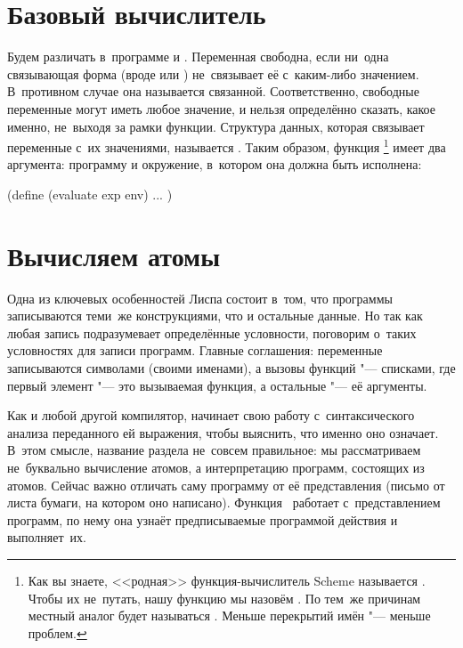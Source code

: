 \section{Базовый вычислитель}\label{basics/sect:basic-evaluator}

Будем различать в~программе  и .
Переменная свободна, если ни~одна связывающая форма (вроде  или
) не~связывает её с~каким-либо значением. В~противном случае она
называется связанной. Соответственно, свободные переменные могут иметь любое
значение, и нельзя определённо сказать, какое именно, не~выходя за рамки
функции. Структура данных, которая связывает переменные с~их значениями,
называется . Таким образом, функция \footnote{Как
вы знаете, <<родная>> функция-вычислитель Scheme называется . Чтобы их
не~путать, нашу функцию мы назовём . По тем~же причинам местный
аналог  будет называться . Меньше перекрытий имён "---
меньше проблем.} имеет два аргумента: программу и окружение, в~котором она
должна быть исполнена:

\begin{code:lisp}
(define (evaluate exp env) ... )
\end{code:lisp}


\section{Вычисляем атомы}\label{basics/sect:evaluating-atoms}

Одна из ключевых особенностей Лиспа состоит в~том, что программы записываются
теми~же конструкциями, что и остальные данные. Но так как любая запись
подразумевает определённые условности, поговорим о~таких условностях для записи
программ. Главные соглашения: переменные записываются символами (своими
именами), а вызовы функций "--- списками, где первый элемент "--- это вызываемая
функция, а остальные "--- её аргументы.

Как и любой другой компилятор,  начинает свою работу
с~синтаксического анализа переданного ей выражения, чтобы выяснить, что именно
оно означает. В~этом смысле, название раздела не~совсем правильное: мы
рассматриваем не~буквально вычисление атомов, а интерпретацию программ,
состоящих из атомов. Сейчас важно отличать саму программу от её представления
(письмо от листа бумаги, на котором оно написано). Функция~
работает с~представлением программ, по нему она узнаёт предписываемые программой
действия и выполняет~их.

